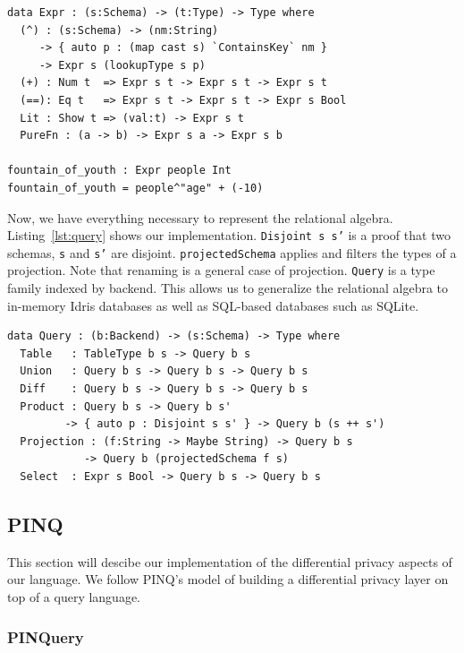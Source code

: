 \documentclass[12pt]{article}
\begin{document}
\begin{lstlisting}[label={lst:expr},caption=Representing typed expressions]
data Expr : (s:Schema) -> (t:Type) -> Type where
  (^) : (s:Schema) -> (nm:String)
     -> { auto p : (map cast s) `ContainsKey` nm }
     -> Expr s (lookupType s p)
  (+) : Num t  => Expr s t -> Expr s t -> Expr s t
  (==): Eq t   => Expr s t -> Expr s t -> Expr s Bool
  Lit : Show t => (val:t) -> Expr s t
  PureFn : (a -> b) -> Expr s a -> Expr s b

fountain_of_youth : Expr people Int
fountain_of_youth = people^"age" + (-10)
\end{lstlisting}

Now, we have everything necessary to represent the relational algebra.
Listing~\ref{lst:query} shows our implementation.
\texttt{Disjoint s s'} is a proof that two schemas, \texttt{s} and \texttt{s'} are disjoint.
\texttt{projectedSchema} applies and filters the types of a projection.
Note that renaming is a general case of projection.
\texttt{Query} is a type family indexed by backend.
This allows us to generalize the relational algebra to in-memory Idris databases as well as SQL-based databases such as SQLite.

\begin{lstlisting}[label={lst:query},caption=Representing typed queries]
data Query : (b:Backend) -> (s:Schema) -> Type where
  Table   : TableType b s -> Query b s
  Union   : Query b s -> Query b s -> Query b s
  Diff    : Query b s -> Query b s -> Query b s
  Product : Query b s -> Query b s'
         -> { auto p : Disjoint s s' } -> Query b (s ++ s')
  Projection : (f:String -> Maybe String) -> Query b s
            -> Query b (projectedSchema f s)
  Select  : Expr s Bool -> Query b s -> Query b s
\end{lstlisting}


\subsection{PINQ}\label{sec:implementation:pinq}

This section will descibe our implementation of the differential privacy aspects of our language. We follow PINQ's model of building a differential privacy layer on top of a query language.

\subsubsection{PINQuery}\label{sec:pinq:pinquery}
\end{document}
